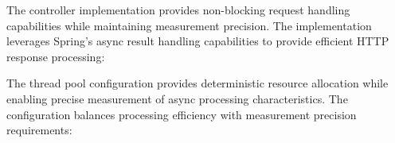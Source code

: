 
The controller implementation provides non-blocking request handling capabilities while maintaining measurement precision. The implementation leverages Spring's async result handling capabilities to provide efficient HTTP response processing:



The thread pool configuration provides deterministic resource allocation while enabling precise measurement of async processing characteristics. The configuration balances processing efficiency with measurement precision requirements:


